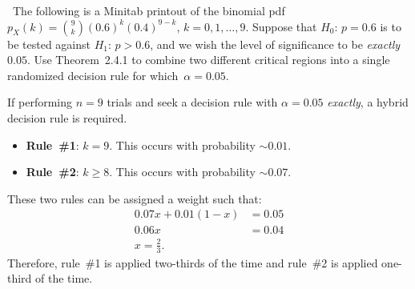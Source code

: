 \begin{problem}
  ~The following is a Minitab printout of the binomial pdf ${p_{X}(k) = \binom{9}{k} (0.6)^k (0.4)^{9-k}}$, ${k=0,1,\ldots,9}$.  Suppose that $H_0$: ${p=0.6}$ is to be tested against ${H_1}$: ${p > 0.6}$, and we wish the level of significance to be \textit{exactly}~${0.05}$.  Use Theorem~2.4.1 to combine two different critical regions into a single randomized decision rule for which~${\alpha = 0.05}$.
\end{problem}

If performing ${n=9}$ trials and seek a decision rule with ${\alpha = 0.05}$ \textit{exactly}, a hybrid decision rule is required.
\begin{itemize}
  \item \textbf{Rule~\#1}: $k=9$.  This occurs with probability $\sim0.01$.
  \item \textbf{Rule~\#2}: ${k \geq 8}$.  This occurs with probability $\sim0.07$.
\end{itemize}
\noindent
These two rules can be assigned a weight such that:
\begin{align*}
  0.07x + 0.01(1 - x) &= 0.05 \\
  0.06x &= 0.04 \\
  \boxed{x = \frac{2}{3}}\text{.}
\end{align*}
\noindent
Therefore, rule~\#1 is applied two-thirds of the time and rule~\#2 is applied one-third of the time.
